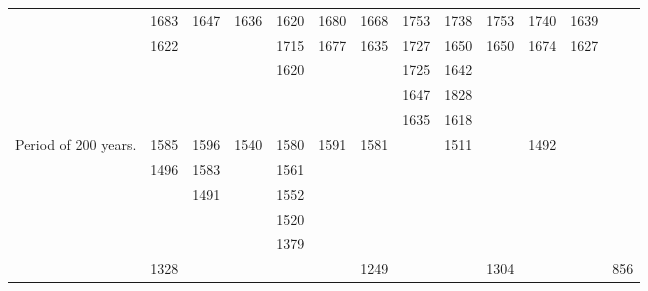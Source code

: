 \documentclass[a4paper, 12pt, oneside]{article}
\begin{document}
\begin{table}[!ht]
\begin{tabular}{|p{20mm}|l|l|l|l|l|l|l|l|l|l|l|l|}
        ~ & 1683 & 1647 & 1636 & 1620 & 1680 & 1668 & 1753 & 1738 & 1753 & 1740 & 1639 & ~ \\
        ~ & 1622 & ~ & ~ & 1715 & 1677 & 1635 & 1727 & 1650 & 1650 & 1674 & 1627 & ~ \\
        ~ & ~ & ~ & ~ & 1620 & ~ & ~ & 1725 & 1642 & ~ & ~ & ~ & ~ \\
        ~ & ~ & ~ & ~ & ~ & ~ & ~ & 1647 & 1828 & ~ & ~ & ~ & ~ \\
        ~ & ~ & ~ & ~ & ~ & ~ & ~ & 1635 & 1618 & ~ & ~ & ~ & ~ \\ \hline
        Period of 200 years. & 1585 & 1596 & 1540 & 1580 & 1591 & 1581 & ~ & 1511 & ~ & 1492 & ~ & ~ \\
        ~ & 1496 & 1583 & ~ & 1561 & ~ & ~ & ~ & ~ & ~ & ~ & ~ & ~ \\
        ~ & ~ & 1491 & ~ & 1552 & ~ & ~ & ~ & ~ & ~ & ~ & ~ & ~ \\
        ~ & ~ & ~ & ~ & 1520 & ~ & ~ & ~ & ~ & ~ & ~ & ~ & ~ \\
        ~ & ~ & ~ & ~ & 1379 & ~ & ~ & ~ & ~ & ~ & ~ & ~ & ~ \\ \hline
        ~ & 1328 & ~ & ~ & ~ & ~ & 1249 & ~ & ~ & 1304 & ~ & ~ & 856 \\ \hline
    \end{tabular}
\end{table}
\end{document}
